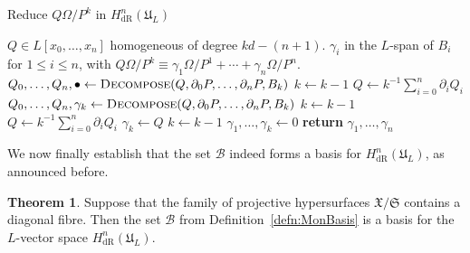 \documentclass[a4paper,11pt]{article}
\numberwithin{equation}{section}
\providecommand{\HdR}{H_{\text{dR}}}    %
\providecommand{\cB}{\mathcal{B}} %
\theoremstyle{definition}
\newtheorem{thm}{Theorem}[section]
\begin{document}
\begin{algorithm}
\caption{Reduce $Q \Omega / P^k$ in $\HdR^n(\mathfrak{U}_L)$}
\label{alg:PoleRed}
\begin{algorithmic}
\vspace{1mm}
\Require $Q \in L[x_0, \dotsc, x_n]$ homogeneous of degree $kd - (n+1)$.
\Ensure  $\gamma_i$ in the $L$-span of $B_i$ for $1 \leq i \leq n$, with  
         $Q \Omega / P^k \equiv \gamma_{1} \Omega / P^{1} + \dotsb + \gamma_n \Omega / P^n$.
\State $Q_0, \dotsc, Q_n, \bullet \gets \Call{Decompose}{Q, \partial_0 P, \dotsc, \partial_n P, B_k}$
\State $k \gets k-1$
\State $Q \gets k^{-1} \sum_{i=0}^n \partial_i Q_i$
\EndWhile
{}
\State $Q_0, \dotsc, Q_n, \gamma_k \gets \Call{Decompose}{Q, \partial_0 P, \dotsc, \partial_n P, B_k}$
\State $k \gets k-1$
\State $Q \gets k^{-1} \sum_{i=0}^n \partial_i Q_i$
\EndWhile
{}
\State $\gamma_{k} \gets Q$
\State $k \gets k-1$
\EndIf
\State $\gamma_{1}, \dotsc, \gamma_{k} \gets 0$
\State \textbf{return} $\gamma_{1}, \dotsc, \gamma_n$
\EndProcedure
\end{algorithmic}
\end{algorithm}

We now finally establish that the set $\cB$ indeed forms a basis for 
$\HdR^n(\mathfrak{U}_L)$, as announced before.

\begin{thm} \label{thm:Basis}
Suppose that the family of projective hypersurfaces $\mathfrak{X}/\mathfrak{S}$ 
contains a diagonal fibre.  Then the set $\cB$ from Definition~\ref{defn:MonBasis} 
is a basis for the $L$-vector space $\HdR^n(\mathfrak{U}_L)$.
\end{thm}
\end{document}
